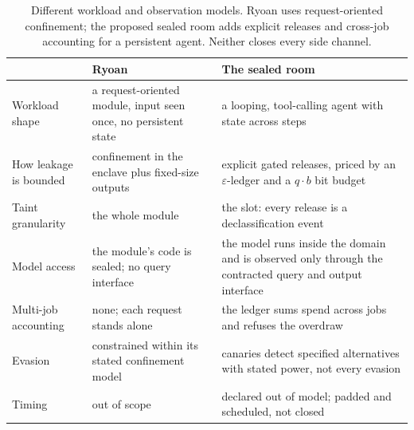 \documentclass[11pt,a4paper]{article}
\theoremstyle{definition}
\begin{document}
\begin{table}[H]\centering\footnotesize
\caption{Different workload and observation models. Ryoan uses request-oriented
confinement; the proposed sealed room adds explicit releases and cross-job
accounting for a persistent agent. Neither closes every side channel.}
\label{tab:sealed-ryoan}
\begin{tabularx}{\textwidth}{@{}>{\raggedright\arraybackslash}p{2.2cm} >{\raggedright\arraybackslash}X >{\raggedright\arraybackslash}X@{}}
\toprule
 & Ryoan & The sealed room \\
\midrule
Workload shape & a request-oriented module, input seen once, no persistent state & a looping, tool-calling agent with state across steps \\
How leakage is bounded & confinement in the enclave plus fixed-size outputs & explicit gated releases, priced by an $\varepsilon$-ledger and a $q\cdot b$ bit budget \\
Taint granularity & the whole module & the slot: every release is a declassification event \\
Model access & the module's code is sealed; no query interface & the model runs inside the domain and is observed only through the contracted query and output interface \\
Multi-job accounting & none; each request stands alone & the ledger sums spend across jobs and refuses the overdraw \\
Evasion & constrained within its stated confinement model & canaries detect specified alternatives with stated power, not every evasion \\
Timing & out of scope & declared out of model; padded and scheduled, not closed \\
\bottomrule
\end{tabularx}
\end{table}
\end{document}
